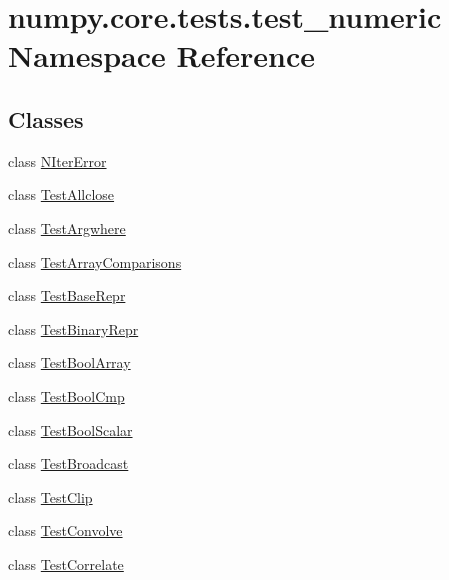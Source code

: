 \hypertarget{namespacenumpy_1_1core_1_1tests_1_1test__numeric}{}\section{numpy.\+core.\+tests.\+test\+\_\+numeric Namespace Reference}
\label{namespacenumpy_1_1core_1_1tests_1_1test__numeric}
\subsection*{Classes}
\begin{DoxyCompactItemize}
\item 
class \hyperlink{classnumpy_1_1core_1_1tests_1_1test__numeric_1_1NIterError}{N\+Iter\+Error}
\item 
class \hyperlink{classnumpy_1_1core_1_1tests_1_1test__numeric_1_1TestAllclose}{Test\+Allclose}
\item 
class \hyperlink{classnumpy_1_1core_1_1tests_1_1test__numeric_1_1TestArgwhere}{Test\+Argwhere}
\item 
class \hyperlink{classnumpy_1_1core_1_1tests_1_1test__numeric_1_1TestArrayComparisons}{Test\+Array\+Comparisons}
\item 
class \hyperlink{classnumpy_1_1core_1_1tests_1_1test__numeric_1_1TestBaseRepr}{Test\+Base\+Repr}
\item 
class \hyperlink{classnumpy_1_1core_1_1tests_1_1test__numeric_1_1TestBinaryRepr}{Test\+Binary\+Repr}
\item 
class \hyperlink{classnumpy_1_1core_1_1tests_1_1test__numeric_1_1TestBoolArray}{Test\+Bool\+Array}
\item 
class \hyperlink{classnumpy_1_1core_1_1tests_1_1test__numeric_1_1TestBoolCmp}{Test\+Bool\+Cmp}
\item 
class \hyperlink{classnumpy_1_1core_1_1tests_1_1test__numeric_1_1TestBoolScalar}{Test\+Bool\+Scalar}
\item 
class \hyperlink{classnumpy_1_1core_1_1tests_1_1test__numeric_1_1TestBroadcast}{Test\+Broadcast}
\item 
class \hyperlink{classnumpy_1_1core_1_1tests_1_1test__numeric_1_1TestClip}{Test\+Clip}
\item 
class \hyperlink{classnumpy_1_1core_1_1tests_1_1test__numeric_1_1TestConvolve}{Test\+Convolve}
\item 
class \hyperlink{classnumpy_1_1core_1_1tests_1_1test__numeric_1_1TestCorrelate}{Test\+Correlate}
\item 

\end{DoxyCompactItemize}

